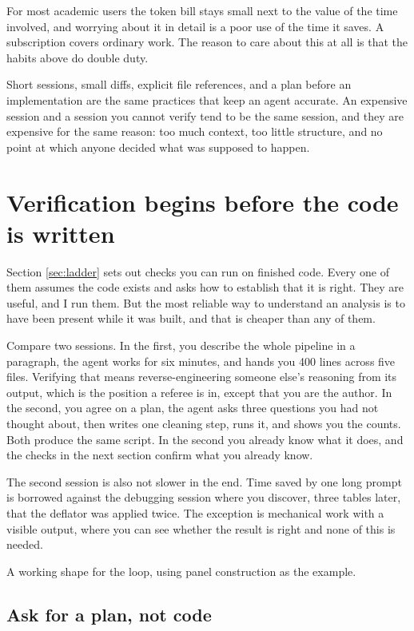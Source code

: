 \documentclass[11pt,a4paper]{article}
\begin{document}
For most academic users the token bill stays small next to the value of the time
involved, and worrying about it in detail is a poor use of the time it saves. A
subscription covers ordinary work. The reason to care about this at all is that
the habits above do double duty.

Short sessions, small diffs, explicit file references, and a plan before an
implementation are the same practices that keep an agent accurate. An expensive
session and a session you cannot verify tend to be the same session, and they are
expensive for the same reason: too much context, too little structure, and no
point at which anyone decided what was supposed to happen.

\section{Verification begins before the code is written}
\label{sec:loop}

Section \ref{sec:ladder} sets out checks you can run on finished code. Every one
of them assumes the code exists and asks how to establish that it is right. They
are useful, and I run them. But the most reliable way to understand an analysis
is to have been present while it was built, and that is cheaper than any of them.

Compare two sessions. In the first, you describe the whole pipeline in a
paragraph, the agent works for six minutes, and hands you 400 lines across five
files. Verifying that means reverse-engineering someone else's reasoning from its
output, which is the position a referee is in, except that you are the author.
In the second, you agree on a plan, the agent asks three questions you had not
thought about, then writes one cleaning step, runs it, and shows you the counts.
Both produce the same script. In the second you already know what it does, and
the checks in the next section confirm what you already know.

The second session is also not slower in the end. Time saved by one long prompt
is borrowed against the debugging session where you discover, three tables later,
that the deflator was applied twice. The exception is mechanical work with a
visible output, where you can see whether the result is right and none of this is
needed.

A working shape for the loop, using panel construction as the example.

\subsection{Ask for a plan, not code}
\end{document}
